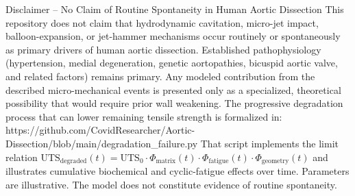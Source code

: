 Disclaimer – No Claim of Routine Spontaneity in Human Aortic Dissection
This repository does not claim that hydrodynamic cavitation, micro-jet impact, balloon-expansion, or jet-hammer mechanisms occur routinely or spontaneously as primary drivers of human aortic dissection.  
Established pathophysiology (hypertension, medial degeneration, genetic aortopathies, bicuspid aortic valve, and related factors) remains primary. Any modeled contribution from the described micro-mechanical events is presented only as a specialized, theoretical possibility that would require prior wall weakening.  
The progressive degradation process that can lower remaining tensile strength is formalized in:
https://github.com/CovidResearcher/Aortic-Dissection/blob/main/degradation_failure.py  
That script implements the limit relation
\( \mathrm{UTS_{degraded}}(t) = \mathrm{UTS}_0 \cdot \Phi_{\mathrm{matrix}}(t) \cdot \Phi_{\mathrm{fatigue}}(t) \cdot \Phi_{\mathrm{geometry}}(t) \)
and illustrates cumulative biochemical and cyclic-fatigue effects over time. Parameters are illustrative. The model does not constitute evidence of routine spontaneity.
